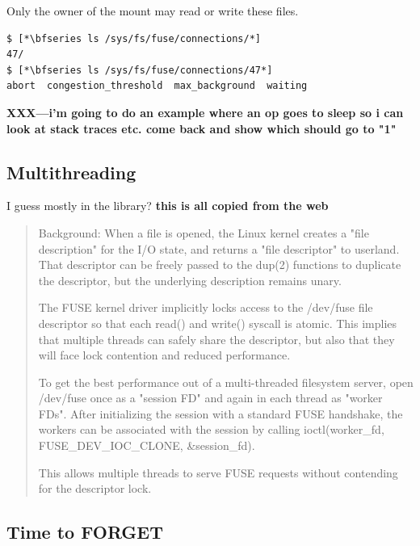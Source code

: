 \noindent
Only the owner of the mount may read or write these files.

\begin{lstlisting}
$ [*\bfseries ls /sys/fs/fuse/connections/*]
47/
$ [*\bfseries ls /sys/fs/fuse/connections/47*]
abort  congestion_threshold  max_background  waiting
\end{lstlisting}

\noindent
\textbf{XXX---i'm going to do an example where an op goes to sleep so i can look at stack traces etc. come back and show  which should go to "1"}


\subsection{Multithreading}

I guess mostly in the library? \textbf{this is all copied from the web}

\begin{quote}
Background: When a file is opened, the Linux kernel creates a "file description" for the I/O state, and returns a "file descriptor" to userland. That descriptor can be freely passed to the dup(2) functions to duplicate the descriptor, but the underlying description remains unary.

The FUSE kernel driver implicitly locks access to the /dev/fuse file descriptor so that each read() and write() syscall is atomic. This implies that multiple threads can safely share the descriptor, but also that they will face lock contention and reduced performance.

To get the best performance out of a multi-threaded filesystem server, open /dev/fuse once as a "session FD" and again in each thread as "worker FDs". After initializing the session with a standard FUSE handshake, the workers can be associated with the session by calling ioctl(worker\_fd, FUSE\_DEV\_IOC\_CLONE, \&session\_fd).

This allows multiple threads to serve FUSE requests without contending for the descriptor lock.
\end{quote}


\subsection{Time to FORGET}

